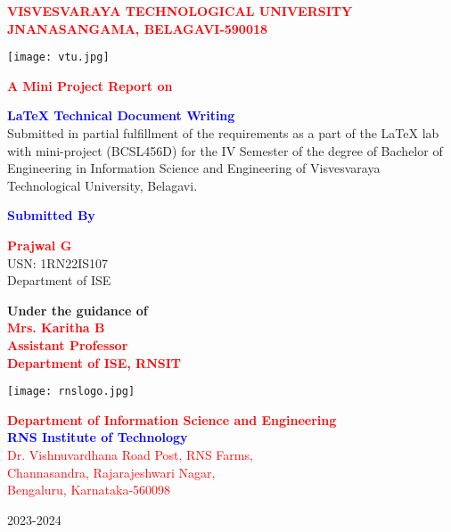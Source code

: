 \documentclass{article}
\begin{document}
\begin{titlepage}
\centering

\textcolor{red}{\textbf{\LARGE VISVESVARAYA TECHNOLOGICAL UNIVERSITY\\{\textbf{\Large JNANASANGAMA, BELAGAVI-590018}}}}

\vspace{0.5cm}

\texttt{[image: vtu.jpg]}

\vspace{0.5cm}

\textcolor{red}{\textbf{\Large A Mini Project Report on}}\\

\vspace{0.5cm}

\textcolor{blue}{\textbf{\Huge LaTeX Technical Document Writing}}\\
Submitted in partial fulfillment of the requirements as a part of the LaTeX lab with mini-project (BCSL456D) for the IV Semester of the degree of Bachelor of Engineering in Information Science and Engineering of Visvesvaraya Technological University, Belagavi.

\vspace{0.5cm}

\textcolor{blue}{\textbf{\Large Submitted By}}\\

\vspace{0.4cm}

\textcolor{red}{\textbf{Prajwal G}}\\
USN: 1RN22IS107 \\
Department of ISE

\vspace{0.4cm}

\textsf{\textbf{Under the guidance of}}\\

\textcolor{red}{\textbf{Mrs. Karitha B\\
Assistant Professor \\
Department of ISE, RNSIT}}

\vspace{0.5cm}

\texttt{[image: rnslogo.jpg]}

\vspace{1.5cm}

\textcolor{red}{\textbf{Department of Information Science and Engineering}}\\
\textcolor{blue}{\textbf{RNS Institute of Technology}}\\
\textcolor{red}{Dr. Vishnuvardhana Road Post, RNS Farms, \\
Channasandra, Rajarajeshwari Nagar, \\
Bengaluru, Karnataka-560098}

\vspace{1cm}

2023-2024

\end{titlepage}
\end{document}
